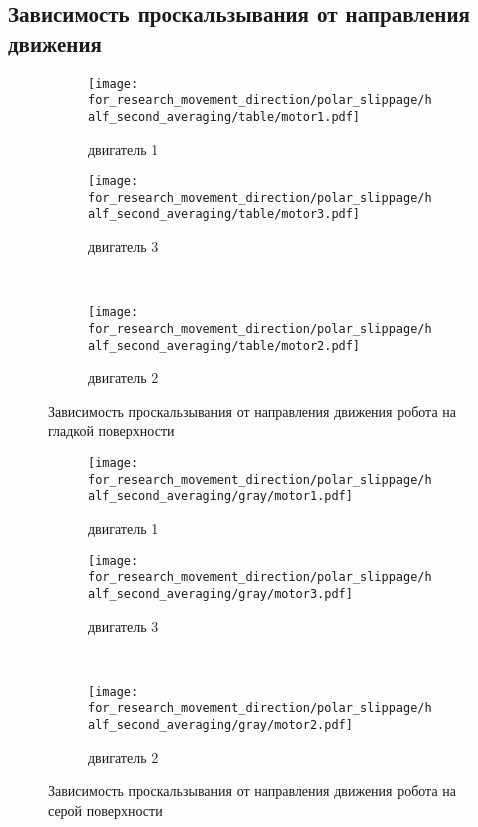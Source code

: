 \subsection{Зависимость проскальзывания от направления движения}

\begin{figure}[H]
    \centering
    \begin{subfigure}{0.49\textwidth}
        \centering
        \texttt{[image: for\_research\_movement\_direction/polar\_slippage/half\_second\_averaging/table/motor1.pdf]}
        \caption{двигатель 1}
    \end{subfigure}
    \hspace{0.005\textwidth}
    \begin{subfigure}{0.49\textwidth}
        \centering
        \texttt{[image: for\_research\_movement\_direction/polar\_slippage/half\_second\_averaging/table/motor3.pdf]}
        \caption{двигатель 3}
    \end{subfigure} \\
    \vspace{4pt}
    \centering
    \begin{subfigure}{0.49\textwidth}
        \centering
        \texttt{[image: for\_research\_movement\_direction/polar\_slippage/half\_second\_averaging/table/motor2.pdf]}
        \caption{двигатель 2}
    \end{subfigure}
    \caption{Зависимость проскальзывания от направления движения робота на гладкой поверхности}
\end{figure}

\begin{figure}[H]
    \centering
    \begin{subfigure}{0.49\textwidth}
        \centering
        \texttt{[image: for\_research\_movement\_direction/polar\_slippage/half\_second\_averaging/gray/motor1.pdf]}
        \caption{двигатель 1}
    \end{subfigure}
    \hspace{0.005\textwidth}
    \begin{subfigure}{0.49\textwidth}
        \centering
        \texttt{[image: for\_research\_movement\_direction/polar\_slippage/half\_second\_averaging/gray/motor3.pdf]}
        \caption{двигатель 3}
    \end{subfigure} \\
    \vspace{4pt}
    \centering
    \begin{subfigure}{0.49\textwidth}
        \centering
        \texttt{[image: for\_research\_movement\_direction/polar\_slippage/half\_second\_averaging/gray/motor2.pdf]}
        \caption{двигатель 2}
    \end{subfigure}
    \caption{Зависимость проскальзывания от направления движения робота на серой поверхности}
\end{figure}

